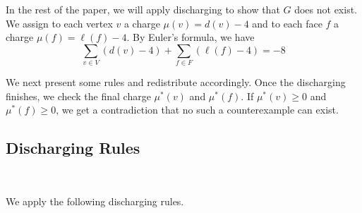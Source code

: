 \documentclass[12pt, reqno]{amsart}
\theoremstyle{plain}
\theoremstyle{definition}
\numberwithin{equation}{section}
\begin{document}
In the rest of the paper, we will apply discharging to show that $G$ does not exist. We assign to each vertex $v$ a charge $\mu(v)=d(v)-4$ and to each face $f$ a charge $\mu(f)=\ell(f)-4$. By Euler's formula, we have
$$\sum_{v\in V}\left(d(v)-4\right)+\sum_{f\in F}(\ell(f)-4)=-8$$



We next present some rules and redistribute accordingly. Once the discharging finishes, we check the final charge $\mu^*(v)$ and $\mu^*(f)$. If $\mu^*(v)\geq 0$ and $\mu^*(f)\geq 0$, we get a contradiction that no such a counterexample can exist.

  




\subsection{Discharging Rules} \label{sub:} ~\medskip

We apply the following discharging rules.
\end{document}
